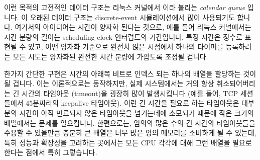이런 목적의 고전적인 데이터 구조는 리눅스 커널에서  이라 불리는
\emph{calendar queue} 입니다.
이 오래된 데이터 구조는 discrete-event 시뮬레이션에서 많이 사용되기도 합니다.
여기서의 아이디어는 시간이 양자화 된다는 것으로, 예를 들어 리눅스 커널에서는
시간 분량의 길이는 scheduling-clock 인터럽트의 기간입니다.
특정 시간은 정수로 표현될 수 있고, 어떤 양자화 기준으로 완전치 않은 시점에서
하나의 타이머를 등록하려는 모든 시도는 양자화된 완전한 시간 분량에 가깝도록
조정될 겁니다.

한가지 간단한 구현은 시간의 아래쪽 비트로 인덱스 되는 하나의 배열을 할당하는
것이 될 겁니다.
이는 이론적으로는 동작하지만, 실제 시스템에서는 거의 항상 취소되어버리는 긴
시간의 타임아웃 (timeout)을 굉장히 많이 발생시킵니다 (예를 들어, TCP 세션들에서
45분짜리의 keepalive 타임아웃).
이런 긴 시간을 필요로 하는 타임아웃은 대부분의 시간이 아직 만료되지 않은
타임아웃을 넘기는데에 소모되기 때문에 작은 크기의 배열에서는 문제를 일으킵니다.
한편으로는, 임의의 많은 수의 긴 시간의 타임아웃들을 수용할 수 있을만큼 충분히
큰 배열은 너무 많은 양의 메모리를 소비하게 될 수 있는데, 특히 성능과 확장성을
고려하는 곳에서는 모든 CPU 각각에 대해 그런 배열을 필요로 한다는 점에서 특히
그렇습니다.

